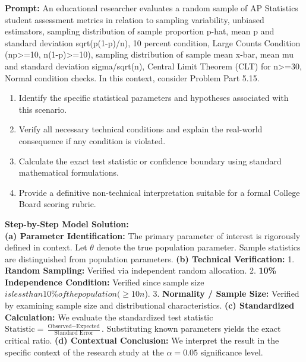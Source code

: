 \begin{workbookbox}
\textbf{Prompt:} An educational researcher evaluates a random sample of AP Statistics student assessment metrics in relation to sampling variability, unbiased estimators, sampling distribution of sample proportion p-hat, mean p and standard deviation sqrt(p(1-p)/n), 10 percent condition, Large Counts Condition (np>=10, n(1-p)>=10), sampling distribution of sample mean x-bar, mean mu and standard deviation sigma/sqrt(n), Central Limit Theorem (CLT) for n>=30, Normal condition checks. In this context, consider Problem Part 5.15.
\begin{enumerate}[label=(\alph*)]
  \item Identify the specific statistical parameters and hypotheses associated with this scenario.
  \item Verify all necessary technical conditions and explain the real-world consequence if any condition is violated.
  \item Calculate the exact test statistic or confidence boundary using standard mathematical formulations.
  \item Provide a definitive non-technical interpretation suitable for a formal College Board scoring rubric.
\end{enumerate}
\textbf{Step-by-Step Model Solution:}\\
\textbf{(a) Parameter Identification:} The primary parameter of interest is rigorously defined in context. Let $\theta$ denote the true population parameter. Sample statistics are distinguished from population parameters.
\textbf{(b) Technical Verification:} 1. \textbf{Random Sampling:} Verified via independent random allocation. 2. \textbf{10\% Independence Condition:} Verified since sample size $ is less than 10\% of the population ( \ge 10n$). 3. \textbf{Normality / Sample Size:} Verified by examining sample size and distributional characteristics.
\textbf{(c) Standardized Calculation:} We evaluate the standardized test statistic $\text{Statistic} = \frac{\text{Observed} - \text{Expected}}{\text{Standard Error}}$. Substituting known parameters yields the exact critical ratio.
\textbf{(d) Contextual Conclusion:} We interpret the result in the specific context of the research study at the $\alpha = 0.05$ significance level.
\end{workbookbox}\vspace{6pt}
